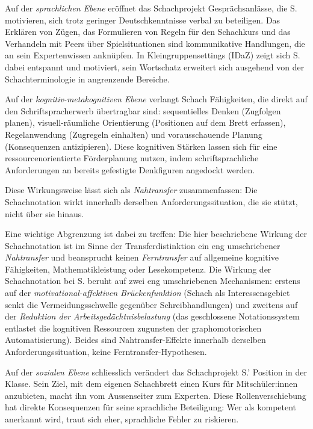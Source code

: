 \documentclass[ngerman, a4paper]{article}
\begin{document}
Auf der \textit{sprachlichen Ebene} eröffnet das Schachprojekt Gesprächsanlässe, die
S. motivieren, sich trotz geringer Deutschkenntnisse verbal zu beteiligen. Das
Erklären von Zügen, das Formulieren von Regeln für den Schachkurs und das
Verhandeln mit Peers über Spielsituationen sind kommunikative Handlungen, die an
sein Expertenwissen anknüpfen. In Kleingruppensettings (IDaZ) zeigt sich S. dabei
entspannt und motiviert, sein Wortschatz erweitert sich ausgehend von der
Schachterminologie in angrenzende Bereiche.

Auf der \textit{kognitiv-metakognitiven Ebene} verlangt Schach Fähigkeiten, die
direkt auf den Schriftspracherwerb übertragbar sind: sequentielles Denken
(Zugfolgen planen), visuell-räumliche Orientierung (Positionen auf dem Brett
erfassen), Regelanwendung (Zugregeln einhalten) und vorausschauende Planung
(Konsequenzen antizipieren). Diese kognitiven Stärken lassen sich für eine
ressourcenorientierte Förderplanung nutzen, indem schriftsprachliche
Anforderungen an bereits gefestigte Denkfiguren angedockt werden.

Diese Wirkungsweise lässt sich als \textit{Nahtransfer} zusammenfassen:
Die Schachnotation wirkt innerhalb derselben Anforderungssituation, die
sie stützt, nicht über sie hinaus.

Eine wichtige Abgrenzung ist dabei zu treffen: Die hier beschriebene
Wirkung der Schachnotation ist im Sinne der Transferdistinktion ein
eng umschriebener \textit{Nahtransfer} und beansprucht keinen
\textit{Ferntransfer} auf allgemeine kognitive Fähigkeiten,
Mathematikleistung oder Lesekompetenz. Die Wirkung der Schachnotation bei S.
beruht auf zwei eng umschriebenen Mechanismen: erstens auf der
\textit{motivational-affektiven Brückenfunktion} (Schach als
Interessensgebiet senkt die Vermeidungsschwelle gegenüber
Schreibhandlungen) und zweitens auf der \textit{Reduktion der
  Arbeitsgedächtnisbelastung} (das geschlossene Notationssystem entlastet
die kognitiven Ressourcen zugunsten der graphomotorischen Automatisierung).
Beides sind Nahtransfer-Effekte innerhalb derselben Anforderungssituation,
keine Ferntransfer-Hypothesen.

Auf der \textit{sozialen Ebene} schliesslich verändert das Schachprojekt S.' Position
in der Klasse. Sein Ziel, mit dem eigenen Schachbrett einen Kurs für Mitschüler:innen
anzubieten, macht ihn vom Aussenseiter zum Experten. Diese Rollenverschiebung hat
direkte Konsequenzen für seine sprachliche Beteiligung: Wer als kompetent anerkannt
wird, traut sich eher, sprachliche Fehler zu riskieren.
\end{document}
